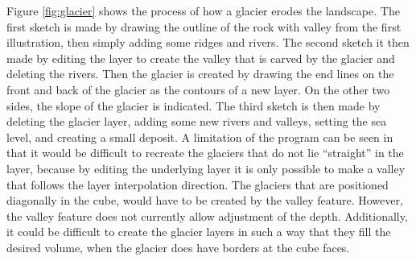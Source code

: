 \documentclass[a4paper,12pt]{report}
\begin{document}
Figure \ref{fig:glacier} shows the process of how a glacier erodes the landscape. The first sketch is made by drawing the outline of the rock with valley from the first illustration, then simply adding some ridges and rivers. The second sketch it then made by editing the layer to create the valley that is carved by the glacier and deleting the rivers. Then the glacier is created by drawing the end lines on the front and back of the glacier as the contours of a new layer. On the other two sides, the slope of the glacier is indicated. The third sketch is then made by deleting the glacier layer, adding some new rivers and valleys, setting the sea level, and creating a small deposit. A limitation of the program can be seen in that it would be difficult to recreate the glaciers that do not lie ``straight'' in the layer, because by editing the underlying layer it is only possible to make a valley that follows the layer interpolation direction. The glaciers that are positioned diagonally in the cube, would have to 
be created by the valley feature. However, the valley feature does not currently allow adjustment of the depth. Additionally, it could be difficult to create the glacier layers in such a way that they fill the desired volume, when the glacier does have borders at the cube faces.
\end{document}
